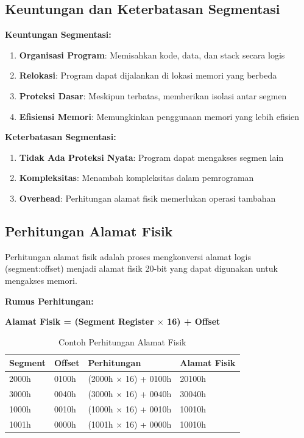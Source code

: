 \documentclass[../main.tex]{subfiles}
\begin{document}
        \subsection{Keuntungan dan Keterbatasan Segmentasi}
            \textbf{Keuntungan Segmentasi:}
            \begin{enumerate}
\item \textbf{Organisasi Program}: Memisahkan kode, data, dan stack secara logis
\item \textbf{Relokasi}: Program dapat dijalankan di lokasi memori yang berbeda
\item \textbf{Proteksi Dasar}: Meskipun terbatas, memberikan isolasi antar segmen
\item \textbf{Efisiensi Memori}: Memungkinkan penggunaan memori yang lebih efisien
            \end{enumerate}

            \textbf{Keterbatasan Segmentasi:}
            \begin{enumerate}
\item \textbf{Tidak Ada Proteksi Nyata}: Program dapat mengakses segmen lain
\item \textbf{Kompleksitas}: Menambah kompleksitas dalam pemrograman
\item \textbf{Overhead}: Perhitungan alamat fisik memerlukan operasi tambahan
            \end{enumerate}

        \subsection{Perhitungan Alamat Fisik}
            Perhitungan alamat fisik adalah proses mengkonversi alamat logis (segment:offset) menjadi alamat fisik 20-bit yang dapat digunakan untuk mengakses memori.

            \textbf{Rumus Perhitungan:}
            \begin{center}
\textbf{Alamat Fisik = (Segment Register $\times$ 16) + Offset}
            \end{center}

            \begin{table}[H]
\centering
\caption{Contoh Perhitungan Alamat Fisik}
\begin{tabular}{|p{2.8cm}|p{2.8cm}|p{2.8cm}|p{5.2cm}|}
    \hline
    \textbf{Segment} & \textbf{Offset} & \textbf{Perhitungan} & \textbf{Alamat Fisik} \\
    \hline
    2000h & 0100h & (2000h $\times$ 16) + 0100h & 20100h \\
    \hline
    3000h & 0040h & (3000h $\times$ 16) + 0040h & 30040h \\
    \hline
    1000h & 0010h & (1000h $\times$ 16) + 0010h & 10010h \\
    \hline
    1001h & 0000h & (1001h $\times$ 16) + 0000h & 10010h \\
    \hline
\end{tabular}
\label{tab:physical-address-calculation}
            \end{table}
\end{document}
